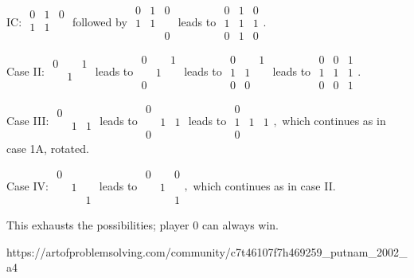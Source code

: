 {    IC: $\begin{array}{ccc}0 & 1 & 0 \\ 1 & 1 & \\ & & \end{array}$ followed by $\begin{array}{ccc}0 & 1 & 0 \\ 1 & 1 & \\ & & 0\end{array}$ leads to $\begin{array}{ccc}0 & 1 & 0 \\ 1 & 1 & 1 \\ 0 & 1 & 0\end{array}.$

    Case II: $\begin{array}{ccc}0 & & 1 \\ &1 & \\ & & \end{array}$ leads to $\begin{array}{ccc}0 & & 1 \\ &1 & \\ 0 & & \end{array}$ leads to $\begin{array}{ccc}0 & & 1 \\ 1 & 1 & \\ 0 & 0 & \end{array}$ leads to $\begin{array}{ccc}0 & 0 & 1 \\ 1 & 1 & 1 \\ 0 & 0 & 1\end{array}.$

    Case III: $\begin{array}{ccc}0 & & \\ &1 & 1 \\ & & \end{array}$ leads to $\begin{array}{ccc}0 & & \\ &1 & 1 \\ 0 & & \end{array}$ leads to $\begin{array}{ccc}0 & & \\ 1 & 1 & 1 \\ 0 & & \end{array},$ which continues as in case 1A, rotated.

    Case IV: $\begin{array}{ccc}0 & & \\ &1 & \\ & & 1\end{array}$ leads to $\begin{array}{ccc}0 & & 0 \\ &1 & \\ & & 1\end{array},$ which continues as in case II.

    This exhausts the possibilities; player 0 can always win.
    }{%
    https://artofproblemsolving.com/community/c7t46107f7h469259_putnam_2002_a4
}
